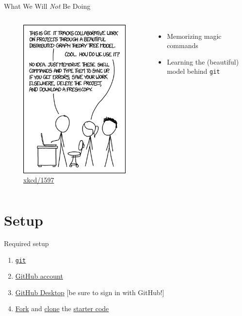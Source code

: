 \documentclass{beamer}
\theoremstyle{example}
\newcommand{\xkcd}[1]{\href{https://xkcd.com/#1}{xkcd/#1}}
\begin{document}
\begin{frame}{What We Will \emph{Not} Be Doing}
    \begin{columns}
        \begin{figure}
            \includegraphics[scale=0.4]{img/git}
            \caption{\xkcd{1597}}
        \end{figure}

        \begin{itemize}
            \item Memorizing magic commands
            \item Learning the (beautiful) model behind \texttt{git}
        \end{itemize}
    \end{columns}
\end{frame}

\section{Setup}
\begin{frame}{Required setup}
    \begin{enumerate}[<+->]
        \item
            \href{https://git-scm.com/book/en/v2/Getting-Started-Installing-Git}
            {\texttt{git}}
        \item
            \href{https://github.com}
            {GitHub account}
        \item \href{https://desktop.github.com}
            {GitHub Desktop} [be sure to sign in with GitHub!]
        \item \href{https://github.com/benknoble/git-wizard-code/fork}{Fork}
            and
            \href{https://help.github.com/en/desktop/contributing-to-projects/cloning-a-repository-from-github-desktop}{clone}
            the
            \href{https://github.com/benknoble/git-wizard-code}{starter code}
    \end{enumerate}
\end{frame}
\end{document}
